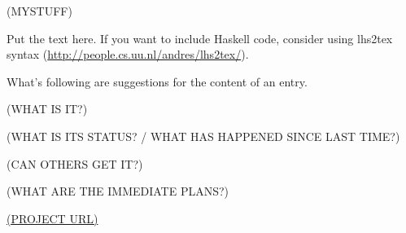 \documentclass[DIV16,twocolumn,10pt]{scrreprt}
\begin{document}
\begin{hcarentry}{(MYSTUFF)}
\makeheader

Put the text here. 
If you want to include Haskell code, consider using lhs2tex syntax (\url{http://people.cs.uu.nl/andres/lhs2tex/}).

What's following are suggestions for the content of an entry.

(WHAT IS IT?)

(WHAT IS ITS STATUS? / WHAT HAS HAPPENED SINCE LAST TIME?)

(CAN OTHERS GET IT?)

(WHAT ARE THE IMMEDIATE PLANS?)

\FurtherReading
  \url{(PROJECT URL)}
\end{hcarentry}
\end{document}
